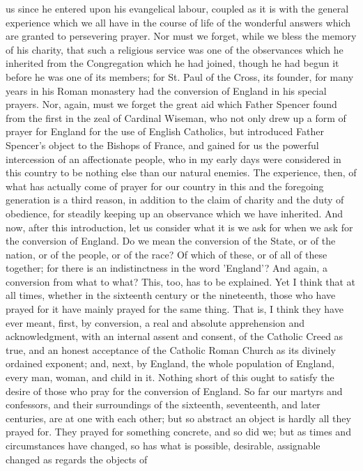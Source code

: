 us since he entered upon his evangelical labour, coupled as it is with
the general experience which we all have in the course of life of the
wonderful answers which are granted to persevering prayer. Nor must we
forget, while we bless the memory of his charity, that such a
religious service was one of the observances which he inherited from
the Congregation which he had joined, though he had begun it before he
was one of its members; for St. Paul of the Cross, its founder, for
many years in his Roman monastery had the conversion of England in his
special prayers. Nor, again, must we forget the great aid which Father
Spencer found from the first in the zeal of Cardinal Wiseman, who not
only drew up a form of prayer for England for the use of English
Catholics, but introduced Father Spencer’s object to the Bishops of
France, and gained for us the powerful intercession of an affectionate
people, who in my early days were considered in this country to be
nothing else than our natural enemies. The experience, then, of what
has actually come of prayer for our country in this and the foregoing
generation is a third reason, in addition to the claim of charity and
the duty of obedience, for steadily keeping up an observance which we
have inherited. And now, after this introduction, let us consider what
it is we ask for when we ask for the conversion of England. Do we mean
the conversion of the State, or of the nation, or of the people, or of
the race? Of which of these, or of all of these together; for there is
an indistinctness in the word 'England'? And again, a conversion from
what to what? This, too, has to be explained. Yet I think that at all
times, whether in the sixteenth century or the nineteenth, those who
have prayed for it have mainly prayed for the same thing. That is, I
think they have ever meant, first, by conversion, a real and absolute
apprehension and acknowledgment, with an internal assent and consent,
of the Catholic Creed as true, and an honest acceptance of the
Catholic Roman Church as its divinely ordained exponent; and, next, by
England, the whole population of England, every man, woman, and child
in it. Nothing short of this ought to satisfy the desire of
those who pray for the conversion of England. So far our martyrs and
confessors, and their surroundings of the sixteenth, seventeenth, and
later centuries, are at one with each other; but so abstract an object
is hardly all they prayed for. They prayed for something concrete, and
so did we; but as times and circumstances have changed, so has what is
possible, desirable, assignable changed as regards the objects of
